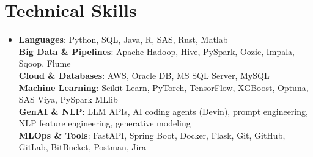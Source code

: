 \section{Technical Skills}
\begin{itemize}[leftmargin=0.15in, label={}]
	\item{
		\textbf{Languages}{: Python, SQL, Java, R, SAS, Rust, Matlab} \\
		\textbf{Big Data \& Pipelines}{: Apache Hadoop, Hive, PySpark, Oozie, Impala, Sqoop, Flume} \\
		\textbf{Cloud \& Databases}{: AWS, Oracle DB, MS SQL Server, MySQL} \\
		\textbf{Machine Learning}{: Scikit-Learn, PyTorch, TensorFlow, XGBoost, Optuna, SAS Viya, PySpark MLlib} \\
		\textbf{GenAI \& NLP}{: LLM APIs, AI coding agents (Devin), prompt engineering, NLP feature engineering, generative modeling} \\
		\textbf{MLOps \& Tools}{: FastAPI, Spring Boot, Docker, Flask, Git, GitHub, GitLab, BitBucket, Postman, Jira} \\
	}
\end{itemize}
\vspace{-15pt}
